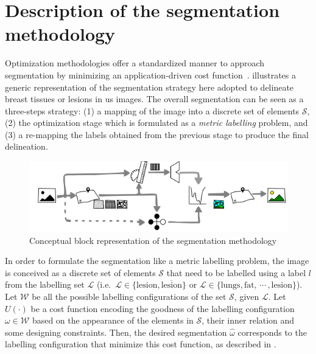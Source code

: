 \graphicspath{ {./content/method/figures/} {./content/intro/figures/} }

\section{Description of the segmentation methodology} 

Optimization methodologies offer a standardized manner to approach segmentation by minimizing an application-driven cost function~\cite{cremers2007review}.
 illustrates a generic representation of the segmentation strategy here adopted to delineate breast tissues or lesions in \ac{us} images. 
The overall segmentation can be seen as a three-steps strategy: 
(1) a mapping of the image into a discrete set of elements $\mathcal{S}$, 
(2) the optimization stage which is formulated as a \emph{metric labelling} problem, 
and (3) a re-mapping the labels obtained from the previous stage to produce the final delineation. 

\begin{figure}[htpb]
  \centering
  \includegraphics[width=0.9\linewidth]{method}
  \caption{Conceptual block representation of the segmentation methodology}
  \label{fig:method}
\end{figure}

In order to formulate the segmentation like a metric labelling problem, the image is conceived as a discrete set of elements $\mathcal{S}$ that need to be labelled using a label $l$ from the labelling set $\mathcal{L}$ 
(i.e.\, $\mathcal{L} \in \{\text{lesion}, \overline{\text{lesion}}\}$ 
or $\mathcal{L} \in \{\text{lungs}, \text{fat},\,\cdots\,, \text{lesion}\}$).
Let $\mathcal{W}$ be all the possible labelling configurations of the set $\mathcal{S}$, given $\mathcal{L}$.
Let $U(\cdot)$ be a cost function encoding the goodness of the labelling configuration $\omega \in \mathcal{W}$ based on the appearance of the elements in $\mathcal{S}$, their inner relation and some designing constraints.
Then, the desired segmentation $\hat{\omega}$ corresponds to the labelling configuration that minimize this cost function, as described in .

